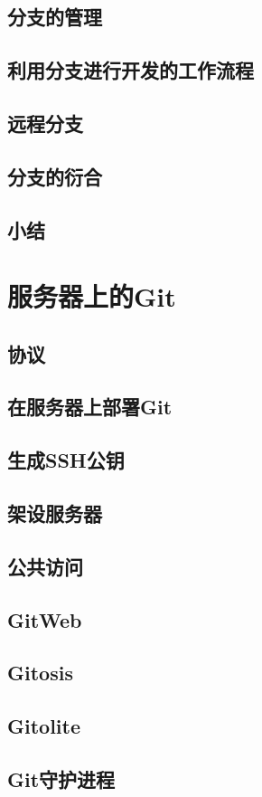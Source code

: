 \documentclass{book}
\begin{document}
	\section{分支的管理}
	\section{利用分支进行开发的工作流程}
	\section{远程分支}
	\section{分支的衍合}
	\section{小结}

\chapter{服务器上的Git}
	\section{协议}
	\section{在服务器上部署Git}
	\section{生成SSH公钥}
	\section{架设服务器}
	\section{公共访问}
	\section{GitWeb}
	\section{Gitosis}
	\section{Gitolite}
	\section{Git守护进程}
\end{document}
